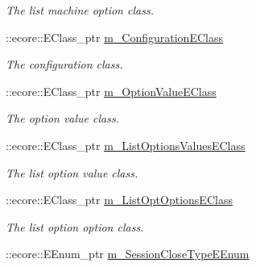 \begin{DoxyCompactItemize}
\begin{DoxyCompactList}\small\item\em The list machine option class. \item\end{DoxyCompactList}\item 
\hypertarget{classUMS__Data_1_1UMS__DataPackage_a4da7d0075e1d336d012b99da1d2b9116}{
::ecore::EClass\_\-ptr \hyperlink{classUMS__Data_1_1UMS__DataPackage_a4da7d0075e1d336d012b99da1d2b9116}{m\_\-ConfigurationEClass}}
\label{classUMS__Data_1_1UMS__DataPackage_a4da7d0075e1d336d012b99da1d2b9116}

\begin{DoxyCompactList}\small\item\em The configuration class. \item\end{DoxyCompactList}\item 
\hypertarget{classUMS__Data_1_1UMS__DataPackage_a71a82e5b1a510895e27887fb8a5e3fd0}{
::ecore::EClass\_\-ptr \hyperlink{classUMS__Data_1_1UMS__DataPackage_a71a82e5b1a510895e27887fb8a5e3fd0}{m\_\-OptionValueEClass}}
\label{classUMS__Data_1_1UMS__DataPackage_a71a82e5b1a510895e27887fb8a5e3fd0}

\begin{DoxyCompactList}\small\item\em The option value class. \item\end{DoxyCompactList}\item 
\hypertarget{classUMS__Data_1_1UMS__DataPackage_a65bd000c29d7c621e20d4bb3ef68ff23}{
::ecore::EClass\_\-ptr \hyperlink{classUMS__Data_1_1UMS__DataPackage_a65bd000c29d7c621e20d4bb3ef68ff23}{m\_\-ListOptionsValuesEClass}}
\label{classUMS__Data_1_1UMS__DataPackage_a65bd000c29d7c621e20d4bb3ef68ff23}

\begin{DoxyCompactList}\small\item\em The list option value class. \item\end{DoxyCompactList}\item 
\hypertarget{classUMS__Data_1_1UMS__DataPackage_a6eb843f5dc73887cb147607cd5ecfa96}{
::ecore::EClass\_\-ptr \hyperlink{classUMS__Data_1_1UMS__DataPackage_a6eb843f5dc73887cb147607cd5ecfa96}{m\_\-ListOptOptionsEClass}}
\label{classUMS__Data_1_1UMS__DataPackage_a6eb843f5dc73887cb147607cd5ecfa96}

\begin{DoxyCompactList}\small\item\em The list option option class. \item\end{DoxyCompactList}\item 
\hypertarget{classUMS__Data_1_1UMS__DataPackage_a03c997a6dc62652543983d4939a0f8e8}{
::ecore::EEnum\_\-ptr \hyperlink{classUMS__Data_1_1UMS__DataPackage_a03c997a6dc62652543983d4939a0f8e8}{m\_\-SessionCloseTypeEEnum}}
\label{classUMS__Data_1_1UMS__DataPackage_a03c997a6dc62652543983d4939a0f8e8}


\end{DoxyCompactItemize}
